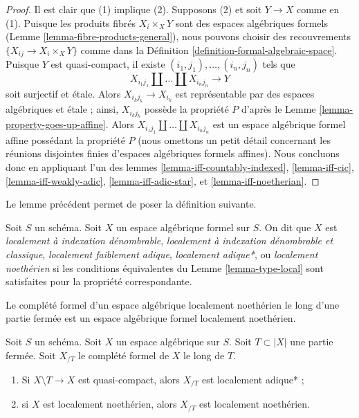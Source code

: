 \begin{proof}
Il est clair que (1) implique (2). Supposons (2) et soit
$Y \to X$ comme en (1). Puisque les produits fibrés $X_i \times_X Y$
sont des espaces algébriques formels (Lemme \ref{lemma-fibre-products-general}),
nous pouvons choisir des recouvrements $\{X_{ij} \to X_i \times_X Y\}$ comme dans la
Définition \ref{definition-formal-algebraic-space}.
Puisque $Y$ est quasi-compact, il existe
$(i_1, j_1), \ldots, (i_n, j_n)$ tels que
$$
X_{i_1 j_1} \amalg \ldots \amalg X_{i_n j_n} \longrightarrow Y
$$
soit surjectif et étale. Alors $X_{i_kj_k} \to X_{i_k}$ est représentable
par des espaces algébriques et étale ; ainsi, $X_{i_kj_k}$ possède la propriété $P$ d'après le
Lemme \ref{lemma-property-goes-up-affine}.
Alors $X_{i_1 j_1} \amalg \ldots \amalg X_{i_n j_n}$ est un
espace algébrique formel affine possédant la propriété $P$ (nous omettons un petit détail
concernant les réunions disjointes finies d'espaces algébriques formels affines).
Nous concluons donc en appliquant l'un des
lemmes \ref{lemma-iff-countably-indexed},
\ref{lemma-iff-cic},
\ref{lemma-iff-weakly-adic},
\ref{lemma-iff-adic-star}, et
\ref{lemma-iff-noetherian}.
\end{proof}

\noindent
Le lemme précédent permet de poser la définition suivante.

\begin{definition}
\label{definition-types-formal-algebraic-spaces}
Soit $S$ un schéma. Soit $X$ un espace algébrique formel sur $S$.
On dit que $X$ est
{\it localement à indexation dénombrable},
{\it localement à indexation dénombrable et classique},
{\it localement faiblement adique},
{\it localement adique*}, ou
{\it localement noethérien}
si les conditions équivalentes du Lemme \ref{lemma-type-local}
sont satisfaites pour la propriété correspondante.
\end{definition}

\noindent
Le complété formel d'un espace algébrique localement noethérien
le long d'une partie fermée est un espace algébrique formel localement noethérien.

\begin{lemma}
\label{lemma-formal-completion-types}
Soit $S$ un schéma. Soit $X$ un espace algébrique sur $S$.
Soit $T \subset |X|$ une partie fermée. Soit $X_{/T}$ le
complété formel de $X$ le long de $T$.
\begin{enumerate}
\item Si $X \setminus T \to X$ est quasi-compact,
alors $X_{/T}$ est localement adique* ;
\item si $X$ est localement noethérien, alors $X_{/T}$ est localement
noethérien.
\end{enumerate}
\end{lemma}

